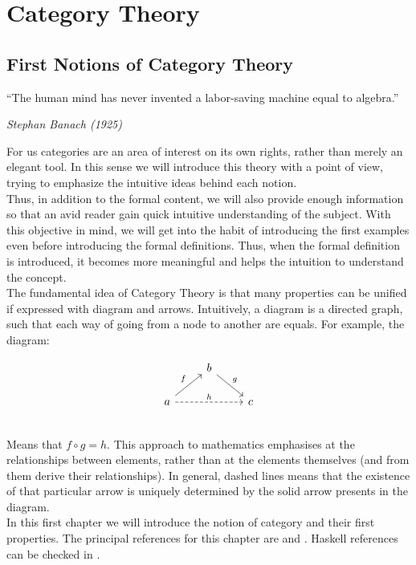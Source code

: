 

\part{Category Theory}
\label{Part1}



\chapter{First Notions of Category Theory}

\epigraph{“The human mind has never invented a labor-saving machine equal to algebra.” }{\textit{Stephan Banach (1925)}}

For us categories are an area of interest on its own rights, rather than merely an elegant tool. In this sense we will introduce this theory with a point of view, trying to emphasize the intuitive ideas behind each notion.\\

Thus, in addition to the formal content, we will also provide enough information so that an avid reader gain quick intuitive understanding of the subject. With this objective in mind, we will get into the habit of introducing the first examples even before introducing the formal definitions. Thus, when the formal definition is introduced, it becomes more meaningful and helps the intuition to understand the concept.\\

The fundamental idea of Category Theory is that many properties can be unified if expressed with diagram and arrows. Intuitively, a diagram is a directed graph, such that each way of going from a node to another are equals. For example, the diagram:

\[
  \begin{tikzcd}
    & b \arrow[rd, "g"]& \\
    a\arrow[ru, "f"] \arrow[rr, "h", dashed] && c\\
  \end{tikzcd}
\]
Means that $f\circ g = h$. This approach to mathematics emphasises  at the relationships between elements, rather than at the elements themselves (and from them derive their relationships). In general, dashed lines means that the existence of that particular arrow is uniquely determined by the solid arrow presents in the diagram.\\

In this first chapter we will introduce the notion of category and their first properties. The principal references for this chapter are \cite{mac2013categories} and \cite{riehl2017category}. Haskell references can be checked in \cite{milewski2018category}.

